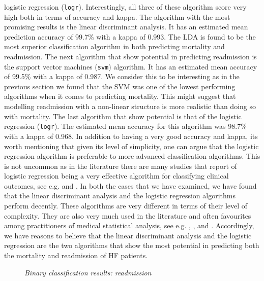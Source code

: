 \documentclass[../thesis.tex]{subfiles}
\begin{document}
\noindent logistic regression (\texttt{logr}). Interestingly, all three of these algorithm score very high both in terms of accuracy and kappa. The algorithm with the most promising results is the linear discriminant analysis. It has an estimated mean prediction accuracy of 99.7\% with a kappa of 0.993. The LDA is found to be the most superior classification algorithm in both predicting mortality and readmission. The next algorithm that show potential in predicting readmission is the support vector machines (\texttt{svm}) algorithm. It has an estimated mean accuracy of 99.5\% with a kappa of 0.987. We consider this to be interesting as in the previous section we found that the SVM was one of the lowest performing algorithms when it comes to predicting mortality. This might suggest that modelling readmission with a non-linear structure is more realistic than doing so with mortality. The last algorithm that show potential is that of the logistic regression (\texttt{logr}). The estimated mean accuracy for this algorithm was 98.7\% with a kappa of 0.968. In addition to having a very good accuracy and kappa, its worth mentioning that given its level of simplicity, one can argue that the logistic regression algorithm is preferable to more advanced classification algorithms. This is not uncommon as in the literature there are many studies that report of logistic regression being a very effective algorithm for classifying clinical outcomes, see e.g. \cite{austin2013using} and \cite{zolfaghar2013big}. In both the cases that we have examined, we have found that the linear discriminant analysis and the logistic regression algorithms perform decently. These algorithms are very different in terms of their level of complexity. They are also very much used in the literature and often favourites among practitioners of medical statistical analysis, see e.g. \cite{austin2013using}, \cite{zolfaghar2013big}, \cite{shah2014phenomapping} and \cite{panahiazar2015using}. Accordingly, we have reasons to believe that the linear discriminant analysis and the logistic regression are the two algorithms that show the most potential in predicting both the mortality and readmission of HF patients.

\begin{figure}[th!]
    \centering
    \scalebox{.8}{}
    \caption[Binary classification results: readmission]{\textit{Binary classification results: readmission}}
    \label{fig:bi_class_read}
\end{figure}
\end{document}
